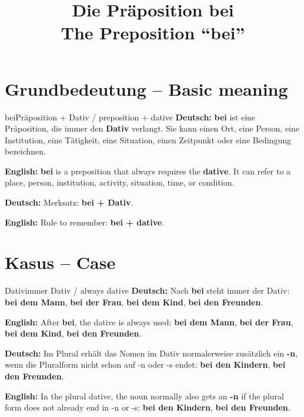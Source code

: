 \documentclass[a4paper,11pt]{article}
\title{Die Präposition \glqq bei\grqq\\\large The Preposition ``bei''}
\date{}
\newcommand{\GermanText}[1]{\textbf{Deutsch: }#1\par}
\newcommand{\EnglishText}[1]{{\small\color{SoftGray}\textbf{English: }#1\par}}
\begin{document}
   \maketitle
   \tableofcontents
   \newpage

   \section{Grundbedeutung -- Basic meaning}
      \begin{grammarentry}{bei}{Präposition + Dativ / preposition + dative}
         \GermanText{\textbf{bei} ist eine Präposition, die immer den \textbf{Dativ} verlangt. Sie kann einen Ort, eine Person, eine Institution, eine Tätigkeit, eine Situation, einen Zeitpunkt oder eine Bedingung bezeichnen.}
         \EnglishText{\textbf{bei} is a preposition that always requires the \textbf{dative}. It can refer to a place, person, institution, activity, situation, time, or condition.}
         \GermanText{Merksatz: \textbf{bei + Dativ}.}
         \EnglishText{Rule to remember: \textbf{bei + dative}.}
      \end{grammarentry}

   \section{Kasus -- Case}
      \begin{grammarentry}{Dativ}{immer Dativ / always dative}
         \GermanText{Nach \textbf{bei} steht immer der Dativ: \textbf{bei dem Mann}, \textbf{bei der Frau}, \textbf{bei dem Kind}, \textbf{bei den Freunden}.}
         \EnglishText{After \textbf{bei}, the dative is always used: \textbf{bei dem Mann}, \textbf{bei der Frau}, \textbf{bei dem Kind}, \textbf{bei den Freunden}.}
         \GermanText{Im Plural erhält das Nomen im Dativ normalerweise zusätzlich ein \textbf{-n}, wenn die Pluralform nicht schon auf -n oder -s endet: \textbf{bei den Kindern}, \textbf{bei den Freunden}.}
         \EnglishText{In the plural dative, the noun normally also gets an \textbf{-n} if the plural form does not already end in -n or -s: \textbf{bei den Kindern}, \textbf{bei den Freunden}.}
      \end{grammarentry}
\end{document}

